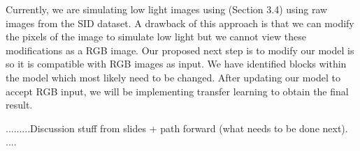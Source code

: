 \documentclass{article}
\begin{document}
Currently, we are simulating low light images using (Section 3.4) using
raw images from the SID dataset. A drawback of this approach is that we
can modify the pixels of the image to simulate low light but we cannot
view these modifications as a RGB image. Our proposed next step is to modify
our model is so it is compatible with RGB images as input. We have identified
blocks within the model which most likely need to be changed. After
updating our model to accept RGB input, we will be implementing transfer
learning to obtain the final result. 

.........Discussion stuff from slides
+ path forward (what needs to be done next).
....




\end{document}
